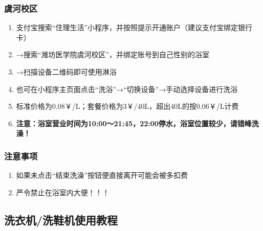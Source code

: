 \subsubsection[虞河校区]{虞河校区}
\label{shower_software_y}
\begin{enumerate}
    \item 支付宝搜索“住理生活”小程序，并按照提示开通账户（建议支付宝绑定银行卡）
    \item →搜索“潍坊医学院虞河校区”，并绑定账号到自己性别的浴室
    \item →扫描设备二维码即可使用淋浴
    \item 也可在小程序主页面点击“洗浴”→“切换设备”→手动选择设备进行洗浴
    \item 标准价格为0.08$￥$/L；套餐价格为3$￥$/40L，超出40L的按0.06$￥$/L计费
    \item \textbf{注意：浴室营业时间为10:00～21:45，22:00停水，浴室位置较少，请错峰洗澡！}
\end{enumerate}
\subsubsection*{注意事项}
\begin{enumerate}
    \item 如果未点击“结束洗澡”按钮便直接离开可能会被多扣费
    \item 严令禁止在浴室内大便！！！
\end{enumerate}

\subsection[洗衣机/洗鞋机使用教程]{洗衣机/洗鞋机使用教程}
